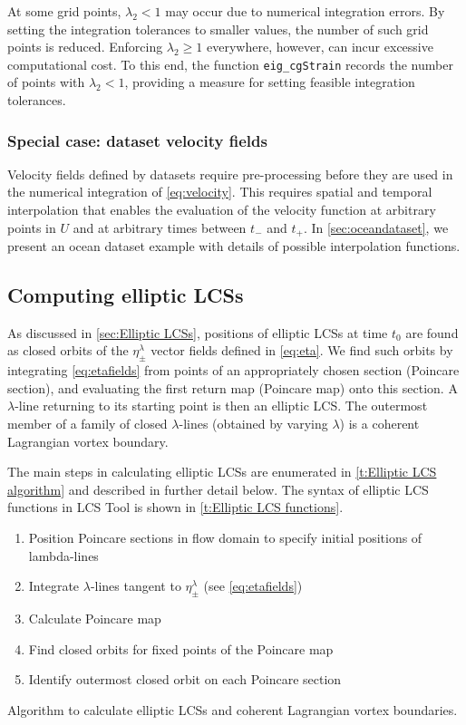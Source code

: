 \documentclass{elsarticle}
\begin{document}
At some grid points, $\lambda_2 < 1$ may occur due to numerical integration errors. By setting the integration tolerances to smaller values, the number of such grid points is reduced. Enforcing $\lambda_2 \geq 1$ everywhere, however, can incur excessive computational cost. To this end, the function \lstinline!eig_cgStrain! records the number of points with $\lambda_2 < 1$, providing a measure for setting feasible integration tolerances.

\subsubsection{Special case: dataset velocity fields}

Velocity fields defined by datasets require pre-processing before
they are used in the numerical integration of \cref{eq:velocity}. This requires spatial and temporal interpolation that enables the evaluation of the velocity function at arbitrary points in $U$ and at arbitrary times between $t_-$ and $t_+$. In \cref{sec:oceandataset}, we present an ocean dataset example with details of possible interpolation functions.

\subsection{Computing elliptic LCSs}

As discussed in \cref{sec:Elliptic LCSs}, positions of elliptic LCSs at time $t_0$ are found as closed orbits of the $\eta_\pm^\lambda$ vector fields defined in \cref{eq:eta}. We find such orbits by integrating \cref{eq:etafields} from points of an appropriately chosen section (Poincare section), and evaluating the first return map (Poincare map) onto this section. A $\lambda$-line returning to its starting point is then an elliptic LCS. The outermost member of a family of closed $\lambda$-lines (obtained by varying $\lambda$) is a coherent Lagrangian vortex boundary\citep{haller13:_coher_lagran}.

The main steps in calculating elliptic LCSs are enumerated in \cref{t:Elliptic LCS algorithm} and described in further detail below. The syntax of elliptic LCS functions in LCS Tool is shown in \cref{t:Elliptic LCS functions}.

\begin{table}
\begin{center}
\begin{enumerate}
\item Position Poincare sections in flow domain to specify initial positions of lambda-lines
\item Integrate $\lambda$-lines tangent to $\eta_\pm^\lambda$ (see \cref{eq:etafields})
\item Calculate Poincare map
\item Find closed orbits for fixed points of the Poincare map
\item Identify outermost closed orbit on each Poincare section
\end{enumerate}
\end{center}
\caption{Algorithm to calculate elliptic LCSs and coherent Lagrangian vortex boundaries.}
\label{t:Elliptic LCS algorithm}
\end{table}
\end{document}
